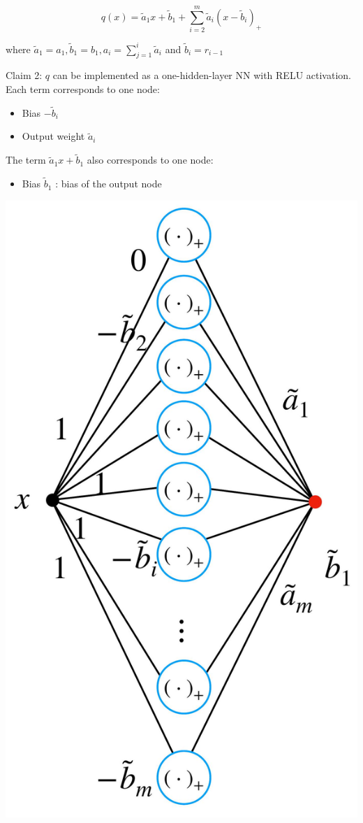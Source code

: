 \documentclass[10pt]{article}
\begin{document}
$$
q(x)=\tilde{a}_{1} x+\tilde{b}_{1}+\sum_{i=2}^{m} \tilde{a}_{i}\left(x-\tilde{b}_{i}\right)_{+}
$$

where $\tilde{a}_{1}=a_{1}, \tilde{b}_{1}=b_{1}, a_{i}=\sum_{j=1}^{i} \tilde{a}_{i}$ and $\tilde{b}_{i}=r_{i-1}$

Claim 2: $q$ can be implemented as a one-hidden-layer NN with RELU activation. Each term corresponds to one node:

\begin{itemize}
  \item Bias $-\tilde{b}_{i}$
  \item Output weight $\tilde{a}_{i}$
\end{itemize}

The term $\tilde{a}_{1} x+\tilde{b}_{1}$ also corresponds to one node:

\begin{itemize}
  \item Bias $\tilde{b}_{1}$ : bias of the output node
\end{itemize}

\begin{center}
\includegraphics[max width=\textwidth]{2024_01_08_0e0dcffe4bc8c6049046g-35}
\end{center}
\end{document}
